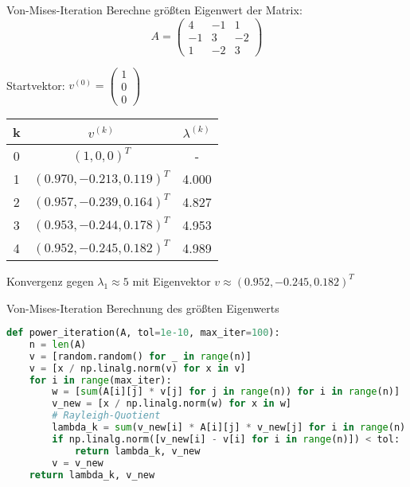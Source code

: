 \begin{example2}{Von-Mises-Iteration}
Berechne größten Eigenwert der Matrix:
$$A = \begin{pmatrix}
4 & -1 & 1\\
-1 & 3 & -2\\
1 & -2 & 3
\end{pmatrix}$$

Startvektor: $v^{(0)} = \begin{pmatrix}1\\ 0\\ 0\end{pmatrix}$

\begin{center}
\begin{tabular}{c|c|c}
k & $v^{(k)}$ & $\lambda^{(k)}$ \\\hline
0 & $(1, 0, 0)^T$ & -\\
1 & $(0.970, -0.213, 0.119)^T$ & 4.000\\
2 & $(0.957, -0.239, 0.164)^T$ & 4.827\\
3 & $(0.953, -0.244, 0.178)^T$ & 4.953\\
4 & $(0.952, -0.245, 0.182)^T$ & 4.989
\end{tabular}
\end{center}

Konvergenz gegen $\lambda_1 \approx 5$ mit Eigenvektor $v \approx (0.952, -0.245, 0.182)^T$
\end{example2}

\begin{examplecode}{Von-Mises-Iteration} Berechnung des größten Eigenwerts
\begin{lstlisting}[language=Python, style=basesmol]
def power_iteration(A, tol=1e-10, max_iter=100):
    n = len(A)
    v = [random.random() for _ in range(n)]
    v = [x / np.linalg.norm(v) for x in v]
    for i in range(max_iter):
        w = [sum(A[i][j] * v[j] for j in range(n)) for i in range(n)]
        v_new = [x / np.linalg.norm(w) for x in w]
        # Rayleigh-Quotient
        lambda_k = sum(v_new[i] * A[i][j] * v_new[j] for i in range(n) for j in range(n))
        if np.linalg.norm([v_new[i] - v[i] for i in range(n)]) < tol:
            return lambda_k, v_new
        v = v_new
    return lambda_k, v_new
\end{lstlisting}
\end{examplecode}

